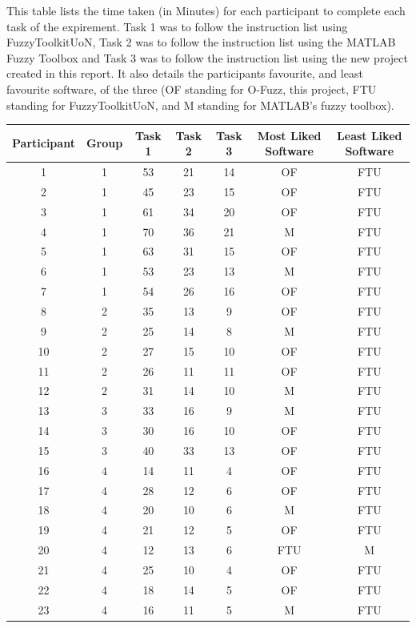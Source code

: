 \noindent 
This table lists the time taken (in Minutes) for each participant to complete each task of the expirement. Task 1 was to follow the instruction list using FuzzyToolkitUoN, Task 2 was to follow the instruction list using the MATLAB Fuzzy Toolbox and Task 3 was to follow the instruction list using the new project created in this report. It also details the participants favourite, and least favourite software, of the three (OF standing for O-Fuzz, this project, FTU standing for FuzzyToolkitUoN, and M standing for MATLAB's fuzzy toolbox).\ \\
\begin{changemargin}{-1cm}{-1cm}
\begin{tabular}{ccccccc}
\hline
Participant	&	Group	&	Task 1	&	Task 2	&	Task 3	&	Most Liked Software	&	Least Liked Software 	\\
\hline
1			&	1		&	53		&	21		&	14		&	OF					&	FTU						\\	
2			&	1		&	45		&	23		&	15		&	OF					&	FTU						\\
3			&	1		&	61		&	34		&	20		&	OF					&	FTU						\\	
4			&	1		&	70		&	36		&	21		&	M					&	FTU						\\	
5			&	1		&	63		&	31		&	15		&	OF					&	FTU						\\		
6			&	1		&	53		&	23		&	13		&	M					&	FTU						\\	
7			&	1		&	54		&	26		&	16		&	OF					&	FTU						\\	
8			&	2		&	35		&	13		&	9		&	OF					&	FTU						\\		
9			&	2		&	25		&	14		&	8		&	M					&	FTU						\\	
10			&	2		&	27		&	15		&	10		&	OF					&	FTU						\\			
11			&	2		&	26		&	11		&	11		&	OF					&	FTU						\\		
12			&	2		&	31		&	14		&	10		&	M					&	FTU						\\		
13			&	3		&	33		&	16		&	9		&	M					&	FTU						\\	
14			&	3		&	30		&	16		&	10		&	OF					&	FTU						\\			
15			&	3		&	40		&	33		&	13		&	OF					&	FTU						\\			
16			&	4		&	14		&	11		&	4 		&	OF					&	FTU						\\		
17			&	4		&	28		&	12		&	6 		&	OF					&	FTU						\\			
18			&	4		&	20		&	10		&	6 		&	M					&	FTU						\\	
19			&	4		&	21		&	12		&	5 		&	OF					&	FTU						\\			
20			&	4		&	12		&	13		&	6 		&	FTU					&	M 						\\			
21			&	4		&	25		&	10		&	4 		&	OF					&	FTU						\\		
22			&	4 		&	18		&	14		&	5 		&	OF					&	FTU						\\
23			&	4 		&	16		&	11		&	5 		&	M					&	FTU						\\
\hline
\end{tabular}			
\end{changemargin}
\newpage 
